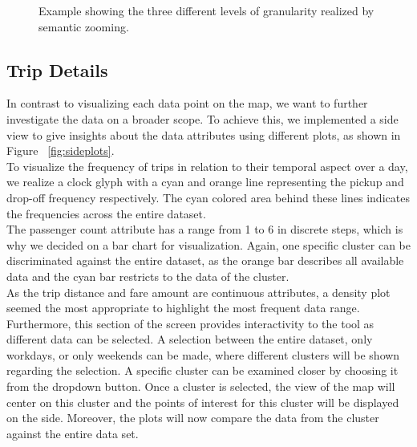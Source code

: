 \documentclass[sigconf, authorversion, nonacm=true]{acmart}
\begin{document}
\begin{figure}[!htb]
\endminipage
\caption{Example showing the three different levels of granularity realized by semantic zooming.}
\label{fig:semanticzoom}
\end{figure}





\subsection{Trip Details}
\label{sec:tripdetail}

In contrast to visualizing each data point on the map, we want to further investigate the data on a broader scope. To achieve this, we implemented a side view to give insights about the data attributes using different plots, as shown in Figure ~\ref{fig:sideplots}.\\
To visualize the frequency of trips in relation to their temporal aspect over a day, we realize a clock glyph with a cyan and orange line representing the pickup and drop-off frequency respectively. The cyan colored area behind these lines indicates the frequencies across the entire dataset.\\

The passenger count attribute has a range from 1 to 6 in discrete steps, which is why we decided on a bar chart for visualization. Again, one specific cluster can be discriminated against the entire dataset, as the orange bar describes all available data and the cyan bar restricts to the data of the cluster. \\
As the trip distance and fare amount are continuous attributes, a density plot seemed the most appropriate to highlight the most frequent data range.\\

Furthermore, this section of the screen provides interactivity to the tool as different data can be selected. A selection between the entire dataset, only workdays, or only weekends can be made, where different clusters will be shown regarding the selection. A specific cluster can be examined closer by choosing it from the dropdown button. Once a cluster is selected, the view of the map will center on this cluster and the points of interest for this cluster will be displayed on the side. Moreover, the plots will now compare the data from the cluster against the entire data set.
\end{document}
